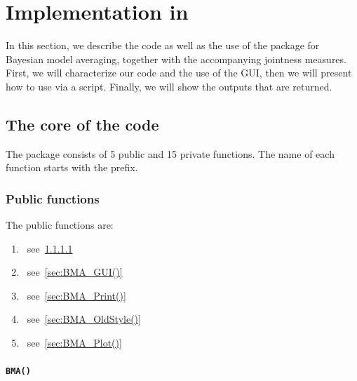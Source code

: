 \section[Implementation in gretl]{Implementation in }\label{BmaGretlSec3}
In this section, we describe the code as well as the use of the 
package for Bayesian model averaging, together with the accompanying
jointness measures. First, we will characterize our code and the use
of the GUI, then we will present how to use  via a
script. Finally, we will show the outputs that are returned.


\subsection[The core of the BMA code]{The core of the  code}
The  package consists of 5 public and 15 private functions.
The name of each function starts with the  prefix.

\subsubsection{Public functions}
The public functions are:
\begin{enumerate}
	\item {}~see~\ref{sec:BMA()}
	\item {}~see~\ref{sec:BMA_GUI()}
	\item {}~see~\ref{sec:BMA_Print()}
	\item {}~see~\ref{sec:BMA_OldStyle()}
	\item {}~see~\ref{sec:BMA_Plot()}
\end{enumerate}


\paragraph{\texttt{BMA()}}\label{sec:BMA()}\mbox{}\\

